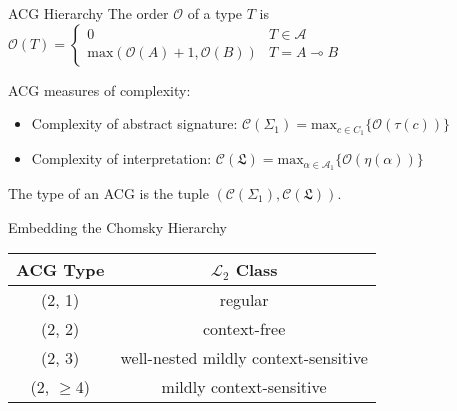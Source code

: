 \documentclass{beamer}
\newcommand{\li}{\!\multimap\!}
\begin{document}
\begin{frame}{ACG Hierarchy}
	\small
	{\footnotesize
	The \alert{order} $\mathcal{O}$ of a type $T$ is 
	$\mathcal{O}(T) = 
			\begin{cases}
				0 & T \in \mathcal{A} \\ 
				\mathrm{max}\left( {\mathcal{O}(A) + 1, \mathcal{O}(B)} \right)
				& T = A\li B
	\end{cases}$}
	\vfill	
	
	\pause
	ACG \alert{measures of complexity}:
	\begin{itemize}
		\item Complexity of abstract signature:
			$\mathcal{C}(\Sigma_1) = \mathrm{max}_{c\in {C_1}}\{\mathcal{O}\left(\tau\left(c\right)\right)\}$
		\item Complexity of interpretation:
			$\mathcal{C}(\mathfrak{L}) = \mathrm{max}_{\alpha \in \mathcal{A}_1}\{ \mathcal{O}\left(\eta\left(\alpha\right)\right)\}$
	\end{itemize}
	\begin{flushright}
	The \alert{type} of an ACG is the tuple $\left(\mathcal{C}(\Sigma_1), \mathcal{C}(\mathfrak{L}) \right)$.
	\end{flushright}
	\vfill

	\pause
	\alert{Embedding the Chomsky Hierarchy} \\
	\vfill	
	\centering
	\begin{tabularx}{0.7\textwidth}{cc}
		ACG Type & $\mathcal{L}_2$ Class\\
		\midrule
		(2, 1) & regular\\
		(2, 2) & context-free\\
		(2, 3) & well-nested mildly context-sensitive\\
		(2, $\geq$4) & mildly context-sensitive
	\end{tabularx}
	\vfill
	
\end{frame}
\end{document}
